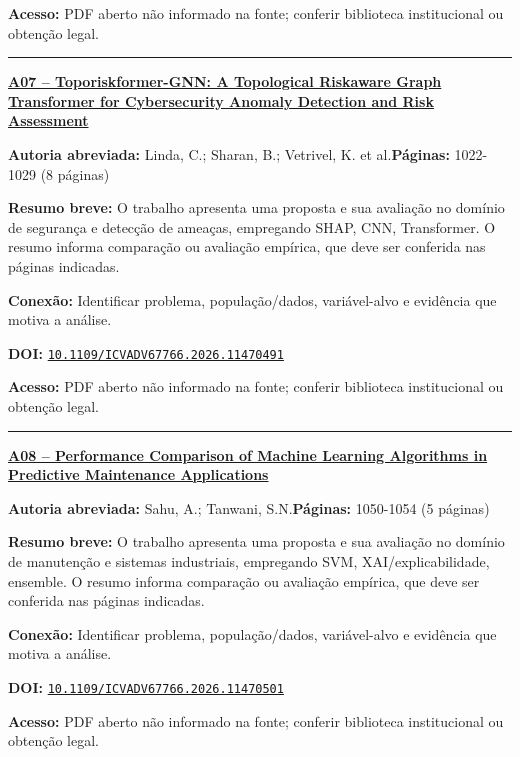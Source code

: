 \documentclass[10pt,a4paper]{article}
\begin{document}
\textbf{Acesso:} PDF aberto não informado na fonte; conferir biblioteca institucional ou obtenção legal.\par
\noindent\rule{\textwidth}{0.35pt}
\par\medskip\noindent
{\large\bfseries\href{https://doi.org/10.1109/ICVADV67766.2026.11470491}{A07 -- Toporiskformer-GNN: A Topological Riskaware Graph Transformer for Cybersecurity Anomaly Detection and Risk Assessment}}\par\smallskip
\textbf{Autoria abreviada:} Linda, C.; Sharan, B.; Vetrivel, K. et al.\quad \textbf{Páginas:} 1022-1029 (8 páginas)\par
\textbf{Resumo breve:} O trabalho apresenta uma proposta e sua avaliação no domínio de segurança e detecção de ameaças, empregando SHAP, CNN, Transformer. O resumo informa comparação ou avaliação empírica, que deve ser conferida nas páginas indicadas.\par
\textbf{Conexão:} Identificar problema, população/dados, variável-alvo e evidência que motiva a análise.\par
\textbf{DOI:} \href{https://doi.org/10.1109/ICVADV67766.2026.11470491}{\nolinkurl{10.1109/ICVADV67766.2026.11470491}}\par
\textbf{Acesso:} PDF aberto não informado na fonte; conferir biblioteca institucional ou obtenção legal.\par
\noindent\rule{\textwidth}{0.35pt}
\par\medskip\noindent
{\large\bfseries\href{https://doi.org/10.1109/ICVADV67766.2026.11470501}{A08 -- Performance Comparison of Machine Learning Algorithms in Predictive Maintenance Applications}}\par\smallskip
\textbf{Autoria abreviada:} Sahu, A.; Tanwani, S.N.\quad \textbf{Páginas:} 1050-1054 (5 páginas)\par
\textbf{Resumo breve:} O trabalho apresenta uma proposta e sua avaliação no domínio de manutenção e sistemas industriais, empregando SVM, XAI/explicabilidade, ensemble. O resumo informa comparação ou avaliação empírica, que deve ser conferida nas páginas indicadas.\par
\textbf{Conexão:} Identificar problema, população/dados, variável-alvo e evidência que motiva a análise.\par
\textbf{DOI:} \href{https://doi.org/10.1109/ICVADV67766.2026.11470501}{\nolinkurl{10.1109/ICVADV67766.2026.11470501}}\par
\textbf{Acesso:} PDF aberto não informado na fonte; conferir biblioteca institucional ou obtenção legal.\par
\end{document}
